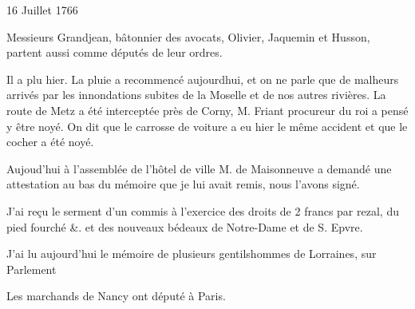                      \begin{diary}{16 Juillet 1766}{}
                        
                        
                           Messieurs
                           Grandjean, bâtonnier des avocats,
                              Olivier,
                           Jaquemin et Husson, partent aussi comme
                           députés de leur ordres. \bigskip
        
        
                         Il a plu hier. La pluie a recommencé aujourdhui, et on ne parle que de malheurs arrivés
                           par les innondations subites de la
                              Moselle
                           et de nos autres rivières. La route de Metz
                           a été interceptée près de Corny,
                              M. Friant
                           procureur du roi a pensé y être noyé. On dit que le
                           carrosse de voiture a eu hier le même accident
                           et que le cocher a été noyé. \bigskip
        
        
                         Aujoud'hui à l'assemblée de l'hôtel de ville
                           M. de Maisonneuve a demandé
                           une attestation
                           au bas du mémoire que je lui avait remis,
                           nous l'avons signé. \bigskip
        
        
                         J'ai
                           reçu le serment d'un commis à l'exercice
                           des droits de 2 francs par rezal, du pied
                           fourché &. et des nouveaux bédeaux de
                           Notre-Dame et de S.
                              Epvre. \bigskip
        
        
                         J'ai lu aujourd'hui le mémoire de
                           plusieurs
                           gentilshommes de Lorraines,
                           sur Parlement
                        \bigskip
        
        
                         Les marchands de Nancy ont député à Paris. \bigskip
        
        
                     \end{diary}

